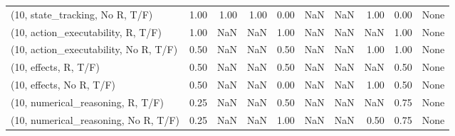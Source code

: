 \begin{table*}[h!]
\begin{adjustbox}{width=2\columnwidth,center}
\begin{tabular}{lrrr|rrr|rrr}
(10, state\_tracking, No R, T/F)       &                      1.00 &                  1.00 &                      1.00 &                          0.00 &                       NaN &                           NaN &                                   1.00 &                               0.00 &                                  None \\
(10, action\_executability, R, T/F)    &                      1.00 &                   NaN &                       NaN &                          1.00 &                       NaN &                           NaN &                                    NaN &                               1.00 &                                  None \\
(10, action\_executability, No R, T/F) &                      0.50 &                   NaN &                       NaN &                          0.50 &                       NaN &                           NaN &                                   1.00 &                               1.00 &                                  None \\
(10, effects, R, T/F)                 &                      0.50 &                   NaN &                       NaN &                          0.50 &                       NaN &                           NaN &                                    NaN &                               0.50 &                                  None \\
(10, effects, No R, T/F)              &                      0.50 &                   NaN &                       NaN &                          0.00 &                       NaN &                           NaN &                                   1.00 &                               0.50 &                                  None \\
(10, numerical\_reasoning, R, T/F)     &                      0.25 &                   NaN &                       NaN &                          0.50 &                       NaN &                           NaN &                                    NaN &                               0.75 &                                  None \\
(10, numerical\_reasoning, No R, T/F)  &                      0.25 &                   NaN &                       NaN &                          1.00 &                       NaN &                           NaN &                                   0.50 &                               0.75 &                                  None \\

\end{tabular}
\end{adjustbox}
\end{table*}
